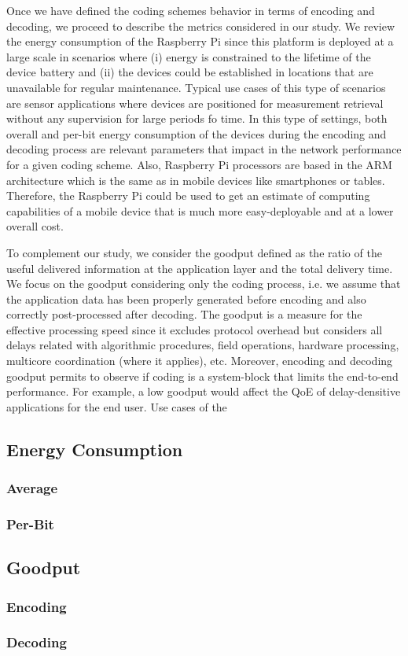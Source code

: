 \label{sec:metrics}

Once we have defined the coding schemes behavior in terms of encoding
and decoding, we proceed to describe the metrics considered in our study.
We review the energy consumption of the Raspberry Pi since this platform
is deployed at a large scale in scenarios where (i) energy is
constrained to the lifetime of the device battery and (ii) the devices
could be established in locations that are unavailable for regular
maintenance. Typical use cases of this type of scenarios are sensor
applications where devices are positioned for measurement retrieval
without any supervision for large periods fo time. In this type of
settings, both overall and per-bit energy consumption of the devices
during the encoding and decoding process are relevant parameters that
impact in the network performance for a given coding scheme. Also,
Raspberry Pi processors are based in the \ac{ARM} architecture which
is the same as in mobile devices like smartphones or tables.
Therefore, the Raspberry Pi could be used to get an estimate of
computing capabilities of a mobile device that is much more easy-deployable
and at a lower overall cost.

To complement our study, we consider the goodput defined as the ratio
of the useful delivered information at the application layer and the total
delivery time. We focus on the goodput considering only the coding process,
i.e. we assume that the application data has been properly
generated before encoding and also correctly post-processed after decoding.
The goodput is a measure for the effective processing speed since it
excludes protocol overhead but considers all delays related with
algorithmic procedures, field operations, hardware processing,
multicore coordination (where it applies), etc. Moreover, encoding
and decoding goodput permits to observe if coding is a system-block
that limits the end-to-end performance. For example, a low goodput
would affect the \ac{QoE} of delay-densitive applications for the
end user. Use cases of the

\subsection{Energy Consumption}
\subsubsection{Average }
\subsubsection{Per-Bit}

\subsection{Goodput}
\subsubsection{Encoding}
\subsubsection{Decoding}

